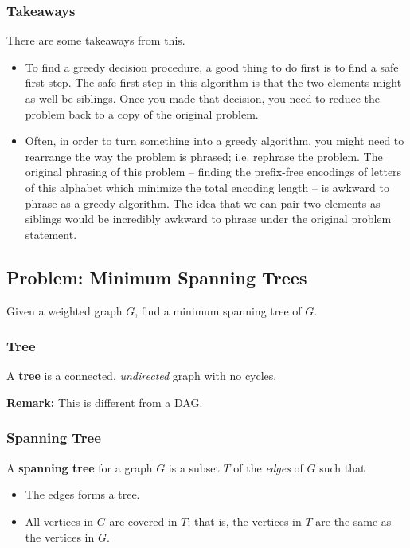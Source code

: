 \documentclass[letterpaper]{article}
\begin{document}
\subsubsection{Takeaways}
There are some takeaways from this. 
\begin{itemize}
    \item To find a greedy decision procedure, a good thing to do first is to find a safe first step. The safe first step in this algorithm is that the two elements might as well be siblings. Once you made that decision, you need to reduce the problem back to a copy of the original problem. 
    \item Often, in order to turn something into a greedy algorithm, you might need to rearrange the way the problem is phrased; i.e. rephrase the problem. The original phrasing of this problem -- finding the prefix-free encodings of letters of this alphabet which minimize the total encoding length -- is awkward to phrase as a greedy algorithm. The idea that we can pair two elements as siblings would be incredibly awkward to phrase under the original problem statement.  
\end{itemize}

\subsection{Problem: Minimum Spanning Trees}
Given a weighted graph $G$, find a minimum spanning tree of $G$. 

\subsubsection{Tree}
\begin{definition}{}{}
    A \textbf{tree} is a connected, \emph{undirected} graph with no cycles. 
\end{definition}
\textbf{Remark:} This is different from a DAG. 

\subsubsection{Spanning Tree}
\begin{definition}{}{}
    A \textbf{spanning tree} for a graph $G$ is a subset $T$ of the \emph{edges} of $G$ such that
    \begin{itemize}
        \item The edges forms a tree. 
        \item All vertices in $G$ are covered in $T$; that is, the vertices in $T$ are the same as the vertices in $G$. 
    \end{itemize}
\end{definition}
\end{document}
